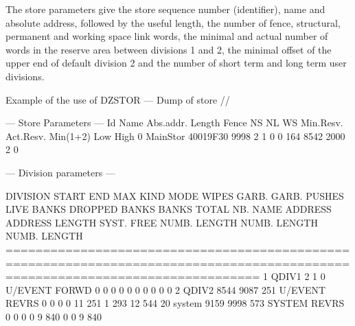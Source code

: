 The store parameters give the store sequence number (identifier),
name and
absolute address, followed by the useful length, the number of fence,
structural, permanent and working space link words, the minimal and
actual number of words in the reserve area between divisions 1 and 2,
the minimal offset of the upper end of default division 2 and the
number of short term and long term user divisions.


\begin{landscapebody}
\mbox{}\vspace*{1cm}
\begin{XMPt}{Example of the use of }
DZSTOR --- Dump of store //                                                                                                      
                                                                                                                                 
 --- Store Parameters ---                                                                                                        
Id    Name    Abs.addr.  Length   Fence      NS      NL      WS  Min.Resv.  Act.Resv.   Min(1+2)   Low  High                     
 0  MainStor  40019F30     9998       2       1       0       0        164       8542       2000     2     0                     
                                                                                                                                 
 --- Division parameters ---                                                                                                     
                                                                                                                                 
   DIVISION    START    END       MAX    KIND   MODE  WIPES  GARB.  GARB. PUSHES      LIVE BANKS  DROPPED BANKS    BANKS TOTAL   
 NB.   NAME   ADDRESS ADDRESS  LENGTH                        SYST.   FREE         NUMB.   LENGTH NUMB.   LENGTH NUMB.   LENGTH   
==============================================================================================================================   
  1  QDIV1          2       1       0 U/EVENT  FORWD      0      0      0      0       0        0     0        0     0        0  
  2  QDIV2       8544    9087     251 U/EVENT  REVRS      0      0      0      0      11      251     1      293    12      544  
 20  system      9159    9998     573  SYSTEM  REVRS      0      0      0      0       9      840     0        0     9      840  
                                                                                                                                 

\end{XMPt}
\end{landscapebody}
